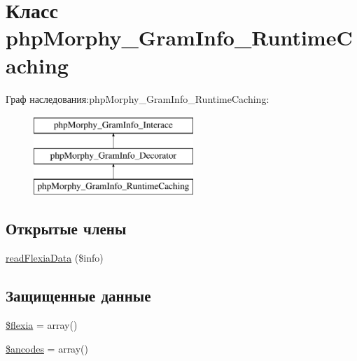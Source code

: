 \hypertarget{classphpMorphy__GramInfo__RuntimeCaching}{
\section{Класс phpMorphy\_\-GramInfo\_\-RuntimeCaching}
\label{classphpMorphy__GramInfo__RuntimeCaching}
}
Граф наследования:phpMorphy\_\-GramInfo\_\-RuntimeCaching:\begin{figure}[H]
\begin{center}
\leavevmode
\includegraphics[height=3.000000cm]{classphpMorphy__GramInfo__RuntimeCaching}
\end{center}
\end{figure}
\subsection*{Открытые члены}
\begin{DoxyCompactItemize}
\item 
\hyperlink{classphpMorphy__GramInfo__RuntimeCaching_a27fa7baf339643edaa25f1285a301b42}{readFlexiaData} (\$info)
\end{DoxyCompactItemize}
\subsection*{Защищенные данные}
\begin{DoxyCompactItemize}
\item 
\hyperlink{classphpMorphy__GramInfo__RuntimeCaching_afa39d553eca4b3c46f88ae89dfe3f00c}{\$flexia} = array()
\item 
\hyperlink{classphpMorphy__GramInfo__RuntimeCaching_a527916c12a65fd2268a1846c4b0e7324}{\$ancodes} = array()
\end{DoxyCompactItemize}


